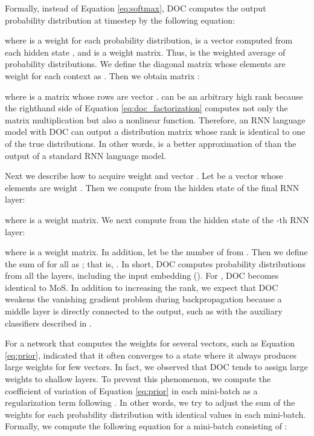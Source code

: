 \documentclass[11pt,a4paper]{article}
\begin{document}
Formally, instead of Equation \ref{eq:softmax}, DOC computes the output probability distribution at timestep  by the following equation:

where  is a weight for each probability distribution,  is a vector computed from each hidden state , and  is a weight matrix.
Thus,  is the weighted average of  probability distributions.
We define the  diagonal matrix whose elements are weight  for each context  as .
Then we obtain matrix :

where  is a matrix whose rows are vector .
 can be an arbitrary high rank because the righthand side of Equation \ref{eq:doc_factorization} computes not only the matrix multiplication but also a nonlinear function.
Therefore, an RNN language model with DOC can output a distribution matrix whose rank is identical to one of the true distributions.
In other words,  is a better approximation of  than the output of a standard RNN language model.



Next we describe how to acquire weight  and vector .
Let  be a vector whose elements are weight .
Then we compute  from the hidden state of the final RNN layer:

where  is a weight matrix.
We next compute  from the hidden state of the -th RNN layer:

where  is a weight matrix.
In addition, let  be the number of  from .
Then we define the sum of  for all  as ; that is, .
In short, DOC computes  probability distributions from all the layers, including the input embedding ().
For , DOC becomes identical to MoS.
In addition to increasing the rank, we expect that DOC weakens the vanishing gradient problem during backpropagation because a middle layer is directly connected to the output, such as with the auxiliary classifiers described in .



For a network that computes the weights for several vectors, such as Equation \ref{eq:prior},  indicated that it often converges to a state where it always produces large weights for few vectors.
In fact, we observed that DOC tends to assign large weights to shallow layers.
To prevent this phenomenon, we compute the coefficient of variation of Equation \ref{eq:prior} in each mini-batch as a regularization term following .
In other words, we try to adjust the sum of the weights for each probability distribution with identical values in each mini-batch.
Formally, we compute the following equation for a mini-batch consisting of :
\end{document}

